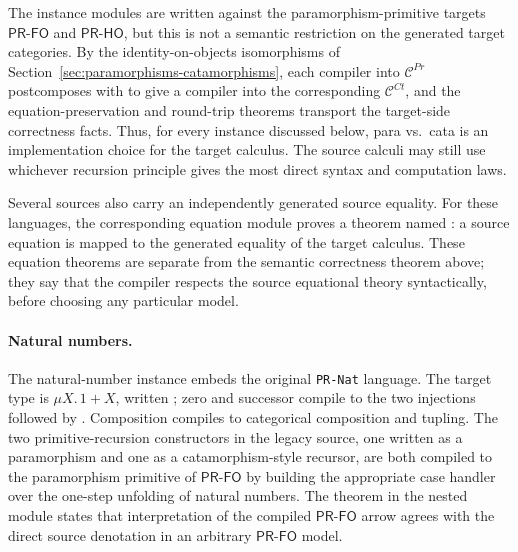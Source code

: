 \documentclass[sigplan,10pt,anonymous,review,screen]{acmart}
\newcommand{\PRFO}{\ensuremath{\mathsf{PR\mbox{-}FO}}}
\newcommand{\PRHO}{\ensuremath{\mathsf{PR\mbox{-}HO}}}
\newcommand{\AgdaFile}[1]{\texttt{#1}}
\begin{document}
The instance modules are written against the paramorphism-primitive
targets \PRFO{} and \PRHO{}, but this is not a semantic restriction on
the generated target categories.  By the identity-on-objects
isomorphisms of Section~\ref{sec:paramorphisms-catamorphisms}, each
compiler into \(\mathcal{C}^{Pr}\) postcomposes with
 to give a compiler into the corresponding
\(\mathcal{C}^{Ct}\), and the equation-preservation and round-trip
theorems transport the target-side correctness facts.  Thus, for every
instance discussed below, para vs.\ cata is an implementation choice for
the target calculus.  The source calculi may still use whichever
recursion principle gives the most direct syntax and computation laws.

Several sources also carry an independently generated source equality.
For these languages, the corresponding equation module proves a theorem
named : a source equation is mapped to the
generated equality of the target calculus.  These equation theorems are
separate from the semantic correctness theorem above; they say that the
compiler respects the source equational theory syntactically, before
choosing any particular model.

\paragraph{Natural numbers.}
The natural-number instance embeds the original \AgdaFile{PR-Nat}
language.  The target type is \(\mu X.\,1+X\), written
; zero and successor compile to the two injections
followed by .  Composition compiles to
categorical composition and tupling.  The two primitive-recursion
constructors in the legacy source, one written as a paramorphism and one
as a catamorphism-style recursor, are both compiled to the paramorphism primitive
of \PRFO{} by building the appropriate case handler over the one-step
unfolding of natural numbers.  The theorem  in
the nested  module states that interpretation of
the compiled \PRFO{} arrow agrees with the direct source denotation in an
arbitrary \PRFO{} model.
\end{document}
